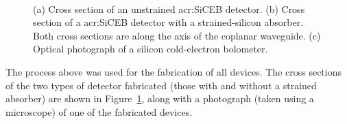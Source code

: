 \begin{figure}[tb]
\begin{center}
\hspace{0.1\textwidth}
\\
\caption[Cross sections of strained and unstrained \gls{acr:SiCEB} structures and photograph of a fabricated detector]{(a) Cross section of an unstrained \gls{acr:SiCEB} detector. (b) Cross section of a \gls{acr:SiCEB} detector with a strained-silicon absorber. Both cross sections are along the axis of the coplanar waveguide. (c) Optical photograph of a silicon cold-electron bolometer.}
\label{fig:CEB_crossSection_photograph}
\end{center}
\end{figure}
\par
The process above was used for the fabrication of all devices. The cross sections of the two types of detector fabricated (those with and without a strained absorber) are shown in Figure~\ref{fig:CEB_crossSection_photograph}, along with a photograph (taken using a microscope) of one of the fabricated devices.
%
